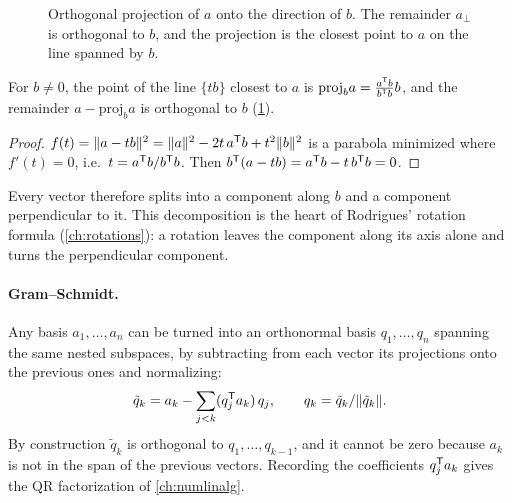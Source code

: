 \begin{figure}[t]
\centering
{}
\caption{Orthogonal projection of $a$ onto the direction of $b$. The remainder $a_\perp$ is orthogonal to $b$, and the
projection is the closest point to $a$ on the line spanned by $b$.}
\label{fig:projection}
\end{figure}

\begin{proposition}
\label{prop:projection-line}
For $b \neq 0$, the point of the line $\{tb\}$ closest to $a$ is $\mathrm{proj}_b a = \frac{a^{\mathsf{T}} b}{b^{\mathsf{T}} b}b$, and the
remainder $a - \mathrm{proj}_b a$ is orthogonal to $b$ (\cref{fig:projection}).
\end{proposition}
\begin{proof}
$f(t) = \|a - tb\|^2 = \|a\|^2 - 2t\,a^{\mathsf{T}} b + t^2\|b\|^2$ is a parabola minimized where $f'(t) = 0$, i.e.\
$t = a^{\mathsf{T}} b/b^{\mathsf{T}} b$. Then $b^{\mathsf{T}}(a - tb) = a^{\mathsf{T}} b - t\,b^{\mathsf{T}} b = 0$.
\end{proof}

Every vector therefore splits into a component along $b$ and a component perpendicular to it. This decomposition
is the heart of Rodrigues' rotation formula (\cref{ch:rotations}): a rotation leaves the component along its axis
alone and turns the perpendicular component.

\paragraph{Gram--Schmidt.}
Any basis $a_1, \dots, a_n$ can be turned into an orthonormal basis $q_1, \dots, q_n$ spanning the same nested
subspaces, by subtracting from each vector its projections onto the previous ones and normalizing:
\begin{equation}
  \tilde q_k = a_k - \sum_{j<k}(q_j^{\mathsf{T}} a_k)\,q_j, \qquad q_k = \tilde q_k/\|\tilde q_k\| .
\end{equation}
By construction $\tilde q_k$ is orthogonal to $q_1, \dots, q_{k-1}$, and it cannot be zero because $a_k$ is not in
the span of the previous vectors. Recording the coefficients $q_j^{\mathsf{T}} a_k$ gives the QR factorization of
\cref{ch:numlinalg}.

